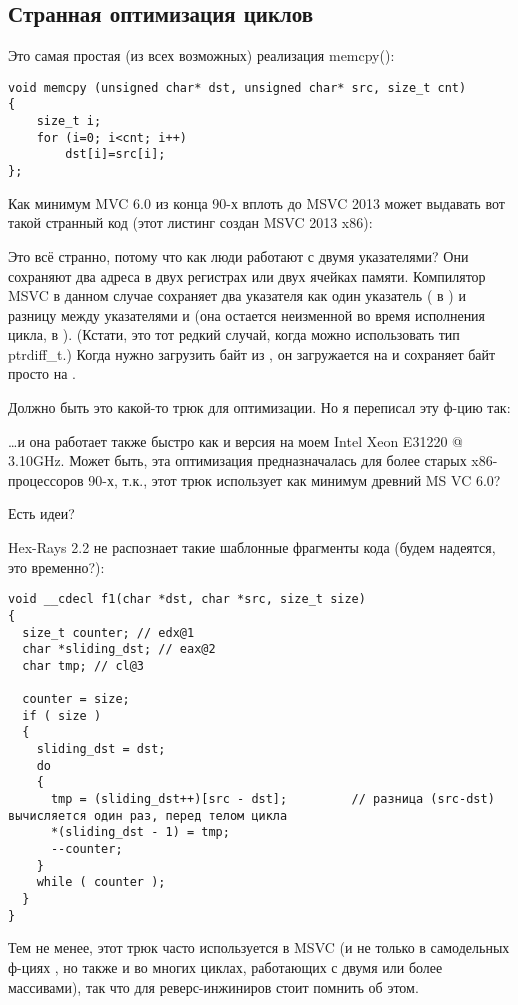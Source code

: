 \subsection{Странная оптимизация циклов}

Это самая простая (из всех возможных) реализация memcpy():

\begin{lstlisting}[style=customc]
void memcpy (unsigned char* dst, unsigned char* src, size_t cnt)
{
	size_t i;
	for (i=0; i<cnt; i++)
		dst[i]=src[i];
};
\end{lstlisting}

Как минимум MVC 6.0 из конца 90-х вплоть до MSVC 2013 может выдавать вот такой странный код (этот листинг создан MSVC 2013
x86):



Это всё странно, потому что как люди работают с двумя указателями? Они сохраняют два адреса в двух регистрах или двух
ячейках памяти.
Компилятор MSVC в данном случае сохраняет два указателя как один указатель ( в \EAX)
и разницу между указателями  и  (она остается неизменной во время исполнения цикла, в \ESI).
(Кстати, это тот редкий случай, когда можно использовать тип ptrdiff\_t.)
Когда нужно загрузить байт из , он загружается на  и сохраняет байт просто на
.

Должно быть это какой-то трюк для оптимизации. Но я переписал эту ф-цию так:



\dots и она работает также быстро как и  версия на моем Intel Xeon E31220 @ 3.10GHz.
Может быть, эта оптимизация предназначалась для более старых x86-процессоров 90-х, т.к., этот трюк использует
как минимум древний MS VC 6.0?

Есть идеи?

Hex-Rays 2.2 не распознает такие шаблонные фрагменты кода (будем надеятся, это временно?):

\begin{lstlisting}[style=customc]
void __cdecl f1(char *dst, char *src, size_t size)
{
  size_t counter; // edx@1
  char *sliding_dst; // eax@2
  char tmp; // cl@3

  counter = size;
  if ( size )
  {
    sliding_dst = dst;
    do
    {
      tmp = (sliding_dst++)[src - dst];         // разница (src-dst) вычисляется один раз, перед телом цикла
      *(sliding_dst - 1) = tmp;
      --counter;
    }
    while ( counter );
  }
}
\end{lstlisting}

Тем не менее, этот трюк часто используется в MSVC (и не только в самодельных ф-циях , но также и во многих
циклах, работающих с двумя или более массивами), так что для реверс-инжиниров стоит помнить об этом.


